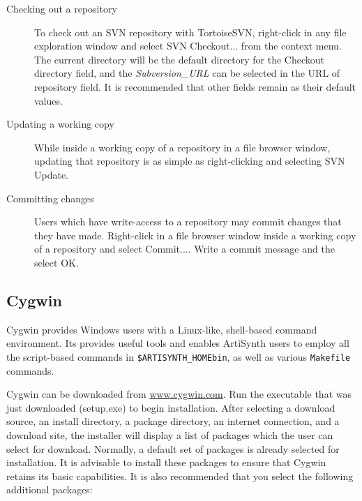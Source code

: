 \begin{description}

\item[Checking out a repository]

To check out an SVN repository with TortoiseSVN, right-click in any
file exploration window and select {\sf SVN Checkout...} from the
context menu. The current directory will be the default directory for
the {\sf Checkout directory} field, and the {\it Subversion\_URL} can
be selected in the {\sf URL of repository} field. It is recommended
that other fields remain as their default values.

\item[Updating a working copy]

While inside a working copy of a repository in a file browser window,
updating that repository is as simple as right-clicking and selecting
{\sf SVN Update}.

\item[Committing changes]

Users which have write-access to a repository may commit changes that
they have made.  Right-click in a file browser window inside a working
copy of a repository and select {\sf Commit...}. Write a commit
message and the select {\sf OK}.

\end{description}

\subsection{Cygwin}
\label{Cygwin}

Cygwin provides Windows users with a Linux-like, shell-based command
environment.  Its provides useful tools and enables ArtiSynth users to
employ all the script-based commands in {\tt \$ARTISYNTH\_HOME\SEP bin}, as well
as various {\tt Makefile} commands.

Cygwin can be downloaded from 
\href{http://www.cygwin.com}{www.cygwin.com}. Run the
executable that was just downloaded (setup.exe) to begin
installation. After selecting a download source, an install directory,
a package directory, an internet connection, and a download site, the
installer will display a list of packages which the user can select
for download. Normally, a default set of packages is already selected
for installation. It is advisable to install these packages to ensure
that Cygwin retains its basic capabilities. It is also recommended
that you select the following additional packages:

